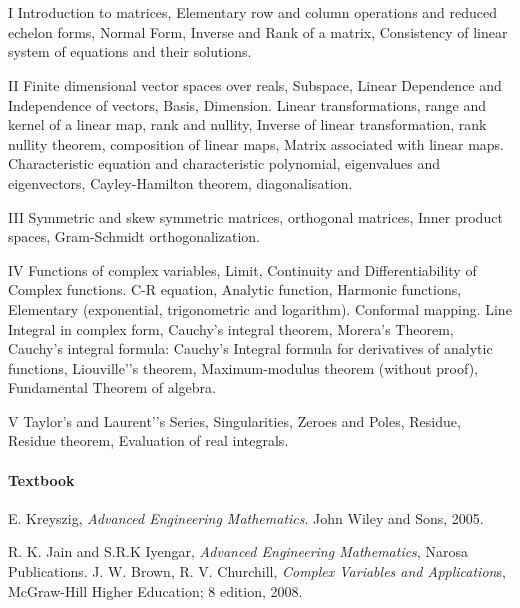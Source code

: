 \vspace{0.1cm}
\section{\courseinfo}
\unit{I} 
Introduction to matrices, Elementary row and column operations and  reduced echelon forms,  Normal Form, Inverse and Rank of a matrix, Consistency of linear system of equations and their solutions.

\unit{II}
Finite dimensional vector spaces over reals, Subspace, Linear Dependence and Independence of vectors, Basis, Dimension. Linear transformations, range and kernel of a linear map, rank and nullity, Inverse of linear transformation, rank nullity theorem, composition of linear maps, Matrix associated with linear maps. Characteristic equation and characteristic polynomial, eigenvalues and eigenvectors, Cayley-Hamilton theorem, diagonalisation.

\unit{III}
Symmetric and skew symmetric matrices, orthogonal matrices, Inner product spaces, Gram-Schmidt orthogonalization.

\unit{IV}
Functions of complex variables, Limit, Continuity and Differentiability of Complex functions. C-R equation, Analytic function,  Harmonic functions, Elementary (exponential, trigonometric and logarithm). Conformal mapping. Line Integral in complex form, Cauchy's integral theorem, Morera's Theorem,  Cauchy's integral formula: Cauchy's Integral formula for derivatives of analytic functions, Liouville'’s theorem, Maximum-modulus theorem (without proof), Fundamental Theorem of algebra.

\unit{V}
Taylor’s and Laurent'’s Series, Singularities, Zeroes and Poles, Residue, Residue theorem, Evaluation of real integrals.

\paragraph{Textbook}
E. Kreyszig, \emph{Advanced Engineering Mathematics}. John Wiley and Sons, 2005.
\begin{thebibliography}{}
\let\clearpage\relax
{} R. K. Jain and S.R.K Iyengar, \emph{Advanced Engineering Mathematics}, Narosa Publications.
     J. W. Brown, R. V. Churchill, \emph{Complex Variables and Application}s, McGraw-Hill Higher Education; 8 edition, 2008. 


\end{thebibliography}














